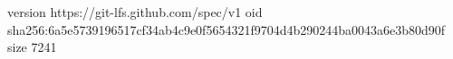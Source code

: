 version https://git-lfs.github.com/spec/v1
oid sha256:6a5e5739196517cf34ab4c9e0f5654321f9704d4b290244ba0043a6e3b80d90f
size 7241
